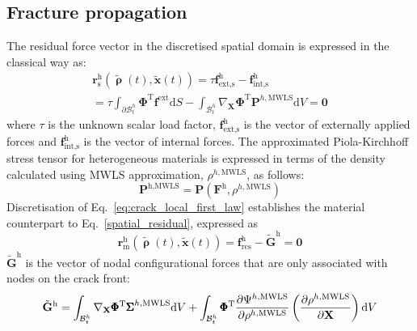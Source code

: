 \documentclass[onecolumn]{svjour3}
\begin{document}
\subsection{Fracture propagation} \label{sec:fem_fracture_prop}
% 
The residual force vector in the discretised spatial domain is expressed in the classical way as:
\begin{equation}
\begin{aligned}
\label{spatial_residual}
	\mathbf{r}_\textrm{s}^\textrm{h}(\tilde{\pmb\uprho}(t), \tilde{\mathbf{x}}(t)) = \tau\mathbf{f}^\textrm{h}_\textrm{ext,s}-\mathbf{f}^\textrm{h}_\textrm{int,s}\\= 
	\tau \int_{\partial\mathcal{B}^h_t} \pmb{\Phi}^\textrm{T}
	\mathbf{f}^\textrm{ext}
	\textrm{d}S
	- \int_{\mathcal{B}^h_t} \nabla_\mathbf{X} \pmb{\Phi}^\textrm{T}
	\mathbf{P}^{h,\textrm{MWLS}}\textrm{d}V=\mathbf{0}
	\end{aligned}
\end{equation}
where $\tau$ is the unknown scalar load factor, $\mathbf{f}^\textrm{h}_\textrm{ext,s}$ is the vector of externally applied forces and $\mathbf{f}^\textrm{h}_\textrm{int,s}$ is the vector of internal forces. The approximated Piola-Kirchhoff stress tensor for heterogeneous materials is expressed in terms of the density 
calculated using MWLS approximation, $\rho^{h,\textrm{MWLS}}$, as follows:
\begin{equation}
	\mathbf{P}^{\textrm{h},\textrm{MWLS}} = 
		\mathbf{P}(
		\mathbf{F}^\textrm{h}, \rho^{h,\textrm{MWLS}})
\end{equation}
% 
Discretisation of Eq.~\ref{eq:crack_local_first_law} establishes the material counterpart to Eq.~\ref{spatial_residual}, expressed as
\begin{equation}
\label{material_residual}
\mathbf{r}_\textrm{m}^\textrm{h}(\tilde{\pmb\uprho}(t), \tilde{\mathbf{x}}(t)) = \mathbf{f}^\textrm{h}_\textrm{res}-\tilde{\mathbf{G}}^\textrm{h}=\mathbf{0}
\end{equation}
$\tilde{\mathbf{G}}^\textrm{h}$ is the vector of nodal configurational forces that are only associated with nodes on the crack front:
\begin{equation}
\begin{aligned}
	\tilde{\mathbf{G}}^\textrm{h} =
	\int_{\mathcal{B}^h_t}
		\nabla_\mathbf{X}\pmb{\Phi}^\textrm{T} {\pmb\Sigma}^{h,\textrm{MWLS}}
	\textrm{d}V 
	+
	\int_{\mathcal{B}^h_t}
		\pmb{\Phi}^\textrm{T} \dfrac{\partial {\Psi}^{h,\textrm{MWLS}} }{\partial \rho^{h,\rm{MWLS}}}
		\left(
			\frac{\partial 
			\rho^{h,\textrm{MWLS}}}{\partial \mathbf{X}}
		\right)
	\textrm{d}V
	\label{eq:mat_int_front}
	\end{aligned}
\end{equation}
\end{document}
